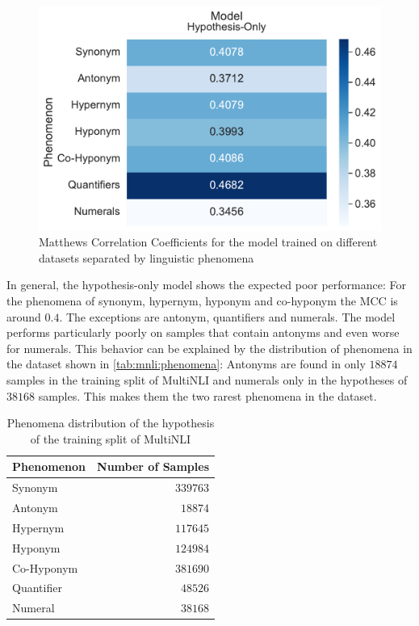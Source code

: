 \begin{figure}[h!]
    \centering
    \includegraphics[width=0.9\columnwidth]{./images/metric_heatmaps_phenomena/important_words/hypothesis_only_matthews_correlation.pdf}
    \caption{Matthews Correlation Coefficients for the model trained on different datasets separated by linguistic phenomena}
    \label{fig:metric-heatmap-phenomena-mcc}
\end{figure}

In general, the hypothesis-only model shows the expected poor performance: For the phenomena of synonym, hypernym, hyponym and co-hyponym the \ac{MCC} is around $0.4$. The exceptions are antonym, quantifiers and numerals. The model performs particularly poorly on samples that contain antonyms and even worse for numerals. This behavior can be explained by the distribution of phenomena in the dataset shown in \autoref{tab:mnli:phenomena}: Antonyms are found in only $18874$ samples in the training split of \ac{MultiNLI} and numerals only in the hypotheses of $38168$ samples. This makes them the two rarest phenomena in the dataset. 

\begin{table}[ht]
    \centering
    \caption{Phenomena distribution of the hypothesis of the training split of \ac{MultiNLI}}
    \small
    \begin{tabular}{l r}
        \toprule
        \multicolumn{1}{c}{Phenomenon} &  \multicolumn{1}{c}{Number of Samples} \\
        \midrule
        Synonym & $339763$ \\
        Antonym & $18874$ \\
        Hypernym & $117645$ \\
        Hyponym & $124984$ \\
        Co-Hyponym & $381690$ \\
        Quantifier & $48526$ \\
        Numeral & $38168$ \\
        \bottomrule
    \end{tabular}
    \label{tab:mnli:phenomena}
\end{table}

